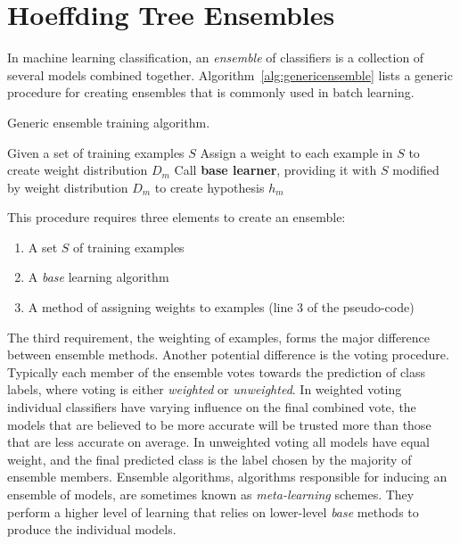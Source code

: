 \chapter{Hoeffding Tree Ensembles}
\label{chap:improvebackground} 

In machine learning classification, an {\em ensemble} of classifiers is a
collection of several models combined together.
Algorithm~\ref{alg:genericensemble} lists a generic procedure for creating ensembles that is commonly used in batch learning.

\begin{algorithm}
\caption{Generic ensemble training algorithm.}
\begin{algorithmic}[1]
\STATE Given a set of training examples $S$
\STATE Assign a weight to each example in $S$ to create weight distribution $D_{m}$
\STATE Call {\bf base learner}, providing it with $S$ modified by weight distribution $D_{m}$ to create hypothesis $h_{m}$
\ENDFOR
\end{algorithmic}
\label{alg:genericensemble}
\end{algorithm}

This procedure requires three elements to create an ensemble:

\begin{enumerate}
\item A set $S$ of training examples
\item A {\em base} learning algorithm
\item A method of assigning weights to examples (line 3 of the pseudo-code)
\end{enumerate}

The third requirement, the weighting of examples, forms the major difference between ensemble methods. Another potential difference is the voting procedure. Typically each member of the
ensemble votes towards the prediction of class labels, where voting is either
{\em weighted} or {\em unweighted}. In weighted voting individual
classifiers have varying influence on the final combined vote,
the models that are believed to be more accurate will be trusted more than
those that are less accurate on average. In unweighted voting all models
have equal weight, and the final predicted class is the label
chosen by the majority of  ensemble members. Ensemble algorithms,
algorithms responsible for inducing an ensemble of models, are sometimes
known as {\em meta-learning} schemes. They perform a higher level of
learning that relies on lower-level {\em base} methods to produce the
individual models.

